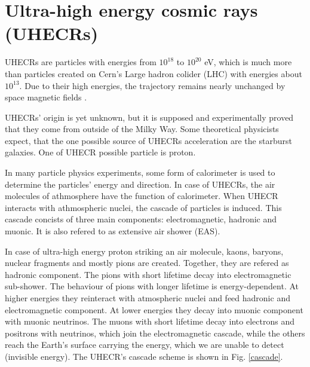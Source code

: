 \section{Ultra-high energy cosmic rays (UHECRs)}
UHECRs are particles with energies from $10^{18}$ to $10^{20}$ eV, which is much more than particles created on Cern's Large hadron colider (LHC) with energies about $10^{13}$. Due to their high energies, the trajectory remains nearly unchanged by space magnetic fields \cite{Benjamin_Skuse}.
\par
UHECRs' origin is yet unknown, but it is supposed and experimentally proved that they come from outside of the Milky Way. Some theoretical physicists expect, that the one possible source of UHECRs acceleration are the starburst galaxies. One of UHECR possible particle is proton. 
\par
In many particle physics experiments, some form of calorimeter is used to determine the particles' energy and direction. In case of UHECRs, the air molecules of athmosphere have the function of calorimeter.
When UHECR interacts with athmospheric nuclei, the cascade of particles is induced. This cascade concists of three main components: electromagnetic, hadronic and muonic. It is also refered to as extensive air shower (EAS).
\par
In case of ultra-high energy proton striking an air molecule, kaons, baryons, nuclear fragments and mostly pions are created. Together, they are refered as hadronic component. The pions with short lifetime decay into electromagnetic sub-shower. The behaviour of pions with longer lifetime is energy-dependent. At higher energies they reinteract with atmospheric nuclei and feed hadronic and electromagnetic component. At lower energies they decay into muonic component with muonic neutrinos. The muons with short lifetime decay into electrons and positrons with neutrinos, which join the electromagnetic cascade, while the others reach the Earth's surface carrying the energy, which we are unable to detect (invisible energy). The UHECR's cascade scheme is shown in Fig. \ref{cascade}. 
